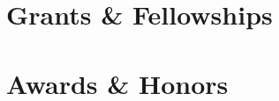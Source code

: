 \documentclass[11pt, a4paper]{article}
\newcommand{\LastName}{Rotsos}
\newcommand{\Initials}{C}
\newcommand{\Me}{\textbf{\LastName, \Initials}}  %
\newcommand{\Duration}[2]{\fontsize{10pt}{0}\selectfont #1--#2}
\newcommand{\Year}[1]{\fontsize{10pt}{0}\selectfont #1}
\begin{document}
\section{Grants \& Fellowships}

\begin{EntriesTable}
\end{EntriesTable}


\section{Awards \& Honors}
\end{document}
